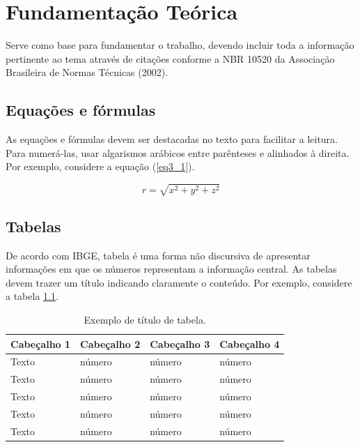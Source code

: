 \chapter{Fundamentação Teórica}\label{cap3}

Serve como base para fundamentar o trabalho, devendo incluir toda a informação pertinente ao tema através de citações  conforme a NBR 10520 da Associação Brasileira de Normas Técnicas (2002).


\section{Equações e fórmulas}

As equações e fórmulas devem ser destacadas no texto para facilitar a leitura.  Para numerá-las, usar algarismos arábicos entre parênteses e alinhados à direita. Por exemplo, considere a equação (\ref{eq3_1}). 

\begin{equation}\label{eq3_1}
	r = \sqrt{x^2 + y^2 + z^2}
\end{equation}

\section{Tabelas}

De acordo com IBGE, tabela é uma forma não discursiva de apresentar informações em que os números representam a informação central. As tabelas devem trazer um título indicando claramente o conteúdo. Por exemplo, considere a tabela \ref{tab:C3_1}.

\begin{table}[htbp]
	\centering
	\caption{Exemplo de título de tabela.}
	\begin{tabular}{p{1in} p{1in} p{1in} p{1in} } \hline
		Cabeçalho 1	& Cabeçalho 2	& Cabeçalho 3	& Cabeçalho 4 \\ \hline
		Texto	& número & número	& número \\ 
		Texto	& número & número	& número \\ 
		Texto	& número & número	& número \\ 
		Texto	& número & número	& número \\ 
		Texto	& número & número	& número \\ \hline
	\end{tabular}
	\label{tab:C3_1}
\end{table}


